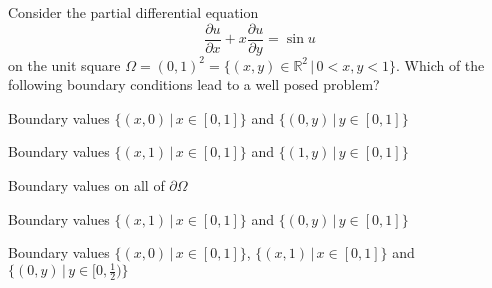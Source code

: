 Consider the partial differential equation
\[
\frac{\partial u}{\partial x}
+x
\frac{\partial u}{\partial y}
=
\sin u
\]
on the unit square
$\Omega=(0,1)^2=\{(x,y)\in\mathbb R^2\,|\, 0<x,y<1\}$.
Which of the following boundary conditions lead to a well posed
problem?
\begin{teilaufgaben}
\item
Boundary values $\{(x,0)\,|\,x\in [0,1]\}$ and $\{(0,y)\,|\,y\in[0,1]\}$
\item
Boundary values $\{(x,1)\,|\,x\in [0,1]\}$ and $\{(1,y)\,|\,y\in[0,1]\}$
\item
Boundary values on all of $\partial\Omega$
\item
Boundary values $\{(x,1)\,|\,x\in [0,1]\}$ and $\{(0,y)\,|\,y\in[0,1]\}$
\item
Boundary values
$\{(x,0)\,|\,x\in [0,1]\}$,
$\{(x,1)\,|\,x\in [0,1]\}$ and 
$\{(0,y)\,|\,y\in[0,\frac12)\}$
\end{teilaufgaben}

